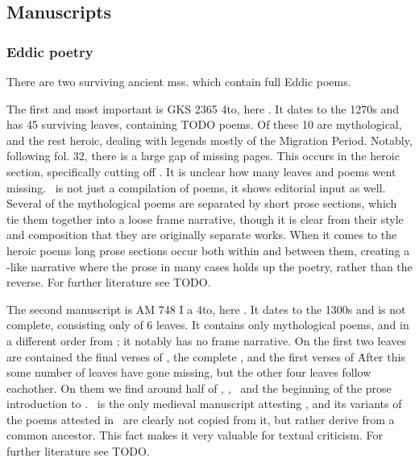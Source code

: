   \subsection{Manuscripts}

    \subsubsection{Eddic poetry}
    There are two surviving ancient mss. which contain full Eddic poems.

    The first and most important is GKS 2365 4to, here \Regius. It dates to the 1270s and has 45 surviving leaves, containing TODO poems. Of these 10 are mythological, and the rest heroic, dealing with legends mostly of the Migration Period. Notably, following fol. 32, there is a large gap of missing pages. This occurs in the heroic section, specifically cutting off \Sigrdrifumal. It is unclear how many leaves and poems went missing.
    \Regius\ is not just a compilation of poems, it shows editorial input as well. Several of the mythological poems are separated by short prose sections, which tie them together into a loose frame narrative, though it is clear from their style and composition that they are originally separate works. When it comes to the heroic poems long prose sections occur both within and between them, creating a -like narrative where the prose in many cases holds up the poetry, rather than the reverse. For further literature see TODO.

    The second manuscript is AM 748 I a 4to, here \AM. It dates to the 1300s and is not complete, consisting only of 6 leaves. It contains only mythological poems, and in a different order from \Regius; it notably has no frame narrative. On the first two leaves are contained the final verses of \Harbardsljod, the complete \Baldrsdraumar, and the first verses of \Skirnismal\. After this some number of leaves have gone missing, but the other four leaves follow eachother. On them we find around half of \Vafthrudnismal, \Grimnismal, \Hymiskvida\ and the beginning of the prose introduction to \Volundarkvida. \AM\ is the only medieval manuscript attesting \Baldrsdraumar, and its variants of the poems attested in \Regius\ are clearly not copied from it, but rather derive from a common ancestor. This fact makes it very valuable for textual criticism. For further literature see TODO.

